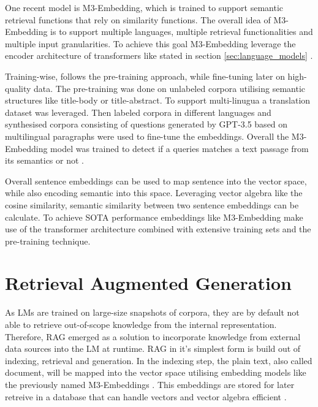 \documentclass[a4paper,oneside,bibliography=totoc]{scrbook}
\begin{document}
One recent model is M3-Embedding, which is trained to support semantic retrieval functions that rely on similarity functions. The overall idea of M3-Embedding is to support multiple languages, multiple retrieval functionalities and multiple input granularities. To achieve this goal M3-Embedding leverage the encoder architecture of transformers like stated in section \ref{sec:language_models} \cite{Chen2024}.

Training-wise, \citet{Chen2024} follows the pre-training approach, while fine-tuning later on high-quality data. The pre-training was done on unlabeled corpora utilising semantic structures like title-body or title-abstract. To support multi-linugua a translation dataset was leveraged. Then labeled corpora in different languages and synthesised corpora consisting of questions generated by \ac{GPT}-3.5 based on multilingual paragraphs were used to fine-tune the embeddings. Overall the M3-Embedding model was trained to detect if a queries matches a text passage from its semantics or not \cite{Chen2024}.

Overall sentence embeddings can be used to map sentence into the vector space, while also encoding semantic into this space. Leveraging vector algebra like the cosine similarity, semantic similarity between two sentence embeddings can be calculate. To achieve SOTA performance embeddings like M3-Embedding make use of the transformer architecture combined with extensive training sets and the pre-training technique.

\section{Retrieval Augmented Generation}
\label{sec:retrieval_augmented_generation}

As \acp{LM} are trained on large-size snapshots of corpora, they are by default not able to retrieve out-of-scope knowledge from the internal representation. Therefore, \ac{RAG} emerged as a solution to incorporate knowledge from external data sources into the \ac{LM} at runtime. \ac{RAG} in it's simplest form is build out of indexing, retrieval and generation. In the indexing step, the plain text, also called document, will be mapped into the vector space utilising embedding models like the previously named M3-Embeddings \cite{Gao2024}. This embeddings are stored for later retreive in a database that can handle vectors and vector algebra efficient \cite{Gao2024,Pan2024}.
\end{document}
